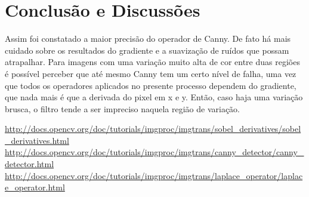 \documentclass[conference,harvard,brazil,english]{sbatex}
\begin{document}
		\section{Conclusão e Discussões}
			Assim foi constatado a maior precisão do operador de Canny. De fato há mais cuidado sobre os resultados do gradiente e a suavização de ruídos que possam atrapalhar. Para imagens com uma variação muito alta de cor entre duas regiões é possível perceber que até mesmo Canny tem um certo nível de falha, uma vez que todos os operadores aplicados no presente processo dependem do gradiente, que nada mais é que a derivada do pixel em x e y. Então, caso haja uma variação brusca, o filtro tende a ser impreciso naquela região de variação.
		
		\cite{docsocv}\newline
		\url{http://docs.opencv.org/doc/tutorials/imgproc/imgtrans/sobel_derivatives/sobel_derivatives.html}\newline
		\url{http://docs.opencv.org/doc/tutorials/imgproc/imgtrans/canny_detector/canny_detector.html}\newline
		\url{http://docs.opencv.org/doc/tutorials/imgproc/imgtrans/laplace_operator/laplace_operator.html}\newline
	
\end{document}
